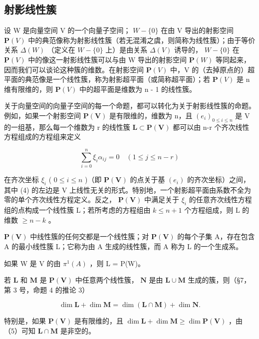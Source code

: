 \subsection{射影线性簇}

设 W 是向量空间 V 的一个向量子空间； \(W - \{0\}\) 在由 V 导出的射影空间 \(\mathbf{P}(V)\) 中的典范像称为射影线性簇（若无混淆之虞，则简称为线性簇）；由于等价关系 \(\Delta(W)\) （定义在 \(W - \{0\}\) 上）是由关系 \(\Delta(V)\) 诱导的， \(W - \{0\}\) 在 \(\mathbf{P}(V)\) 中的像这一射影线性簇可以与由 W 导出的射影空间 \(\mathbf{P}(W)\) 等同起来，因而我们可以谈论这种簇的维数。在射影空间 \(\mathbf{P}(V)\) 中，V 的（去掉原点的）超平面的典范像是一个线性簇，称为射影超平面（或简称超平面）；若 \(\mathbf{P}(V)\) 是 n 维有限维的，则 \(\mathbf{P}(V)\) 中的超平面是维数为 n - 1 的线性簇。

关于向量空间的向量子空间的每一个命题，都可以转化为关于射影线性簇的命题。例如，如果一个射影空间 \(\mathbf{P}(\mathbf{V})\) 是有限维的，维数为 n，且 \((e_{i})_{0\leqslant i\leqslant n}\) 是 V 的一组基，那么每一个维数为 r 的线性簇 \(\mathbf{L}\subset\mathbf{P}(\mathbf{V})\) 都可以由 n-r 个齐次线性方程组成的方程组来定义

\[
\sum_ {i = 0} ^ {n} \xi_ {i} \alpha_ {i j} = 0 \quad (1 \leqslant j \leqslant n - r)\tag{4}
\]

在齐次坐标 \(\xi_{i}\) ( \(0 \leqslant i \leqslant n\) )（即 \(\mathbf{P}(\mathbf{V})\) 的点关于基 \((e_{i})\) 的齐次坐标）之间，其中 (4) 的左边是 V 上线性无关的形式。特别地，一个射影超平面由系数不全为零的单个齐次线性方程定义。反之， \(\mathbf{P}(\mathbf{V})\) 中满足关于 \(\xi_{i}\) 的任意齐次线性方程组的点构成一个线性簇 L；若所考虑的方程组由 \(k \leqslant n + 1\) 个方程组成，则 L 的维数 \(\geqslant n - k\) 。

 \(\mathbf{P}(\mathbf{V})\) 中线性簇的任何交都是一个线性簇；对 \(\mathbf{P}(\mathbf{V})\) 的每个子集 A，存在包含 A 的最小线性簇 L；它称为由 A 生成的线性簇，而 A 称为 L 的一个生成系。

如果 W 是 V 的由 \(\pi^{1}(A)\) ，则 L = P(W)。

若 \(\mathbf{L}\) 和 \(\mathbf{M}\) 是 \(\mathbf{P}(\mathbf{V})\) 中任意两个线性簇， \(\mathbf{N}\) 是由 \(\mathbf{L} \cup \mathbf{M}\) 生成的簇，则（§7，第 3 号，命题 4 的推论 3）

\[
\dim \mathbf {L} + \dim \mathbf {M} = \dim (\mathbf {L} \cap \mathbf {M}) + \dim \mathbf {N}.\tag{5}
\]

特别是，如果 \(\mathbf{P}(\mathbf{V})\) 是有限维的，且 \(\dim \mathbf{L} + \dim \mathbf{M} \geqslant \dim \mathbf{P}(\mathbf{V})\) ，由（5）可知 \(\mathbf{L} \cap \mathbf{M}\) 是非空的。

